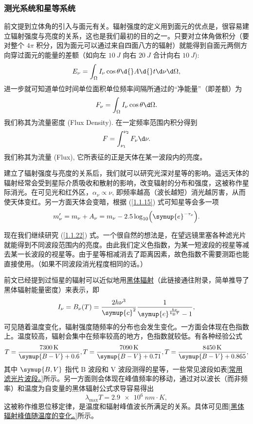 \documentclass[../天体物理基础.tex]{subfiles}
\begin{document}
\subsubsection{测光系统和星等系统}
前文提到立体角的引入与面元有关。辐射强度的定义用到面元的优点是，很容易建立辐射强度与亮度的关系，这也是我们最初的目的之一。只要对立体角做积分（要对整个 $4\pi$ 积分，因为面元可以通过来自四面八方的辐射）就能得到自面元两侧方向穿过面元的能量的差额（如向左 $\qty{10}{J}$ 向右 $\qty{20}{J}$ 合计向右 $\qty{10}{J}$):
\begin{equation}
E_{\nu}=\int_{\Omega}I_{\nu}\cos{\theta}\d{}A\d{}t\d\nu\d\Omega,
\end{equation}
进一步就可知道单位时间单位面积单位频率间隔所通过的“净能量”（即差额）为
\begin{equation}
F_{\nu}=\int_{\Omega}I_{\nu}\cos{\theta}\d\Omega.
\end{equation}
我们称其为流量密度 (Flux Density). 在一定频率范围内积分得到
\begin{equation}
F=\int_{\nu_{1}}^{\nu_{2}}F_{\nu}\d\nu.\label{1.1.22}
\end{equation}
我们称其为流量 (Flux), 它所表征的正是天体在某一波段内的亮度。

建立了辐射强度与亮度的关系后，我们就可以研究光深对星等的影响。遥远天体的辐射经常会受到星际介质吸收和散射的影响，改变辐射的分布和强度，这被称作星际消光。在可见光和红外区，$\alpha_{\nu}\propto\nu$, 即频率越高（波长越短）消光越厉害，从而使天体变红。另一方面天体会变暗，根据 (\ref{1.1.15}) 式可知星等会多一项
\begin{equation}
m_{\nu}'=m_{\nu}+A_{\nu}=m_{\nu}-2.5\log_{10}\mleft(\symup{e}^{-\tau_{\nu}}\mright).
\end{equation}

现在我们继续研究 (\ref{1.1.22}) 式。一个很自然的想法是，在望远镜里塞各种滤光片就能得到不同波段范围内的亮度。由此我们定义色指数，为某一短波段的视星等减去某一长波段的视星等。由于星等相减消去了距离因素，故色指数不需要测距也能直接使用。（如果不同波段消光程度相同的话。）

前文已经提到过恒星的辐射可以近似地用\hyperref[黑体辐射能量密度简单推导]{黑体辐射}（此链接通往附录，简单推导了黑体辐射能量密度）来表示，即
\begin{equation}
I_{\nu}=B_{\nu}\mleft(T\mright)=\frac{2h\nu^{3}}{\symup{c}^{2}}\frac{1}{\symup{e}^{\frac{h\nu}{k_{\mathrm{B}}T}}-1},
\end{equation}
可见随着温度变化，辐射强度随频率的分布也会发生变化。一方面会体现在色指数上。温度较高，辐射会集中在频率较高的地方，色指数就较低。有各种经验公式
\begin{equation}
T=\frac{\qty{7300}{K}}{\symup{B-V}+0.6}, T=\frac{\qty{7090}{K}}{\symup{B-V}+0.71}, T=\frac{\qty{8450}{K}}{\symup{B-V}+0.865},
\end{equation}
其中 $\symup{B, V}$ 指代 B 波段和 V 波段测得的星等，一些常见波段如表\ref{常用滤光片波段。}所示。另一方面则会体现在峰值频率的移动，通过对以波长（而非频率）和温度为自变量的黑体辐射公式求导容易得出
\begin{equation}
\lambda_{\max}T=\qty{2.9e6}{nm\cdot K},
\end{equation}
这被称作维恩位移定律，是温度和辐射峰值波长所满足的关系。具体可见图\ref{黑体辐射峰值随温度的变化。}所示。
\end{document}
